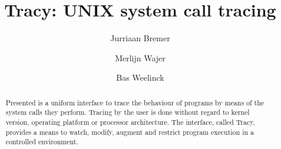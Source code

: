 \documentclass[a4paper, 10pt]{report}
\author{Jurriaan Bremer \and Merlijn Wajer \and Bas Weelinck}
\title{Tracy: UNIX system call tracing}
\begin{document}
\maketitle

\nocite{*}


\begin{abstract}
Presented is a uniform interface to trace the behaviour of programs
by means of the system calls they perform. Tracing by the user is done without
regard to kernel version, operating platform or processor architecture.
The interface, called Tracy, provides a means to watch, modify, augment
and restrict program execution in a controlled environment.
\end{abstract}

\tableofcontents

%


%





%
\end{document}
